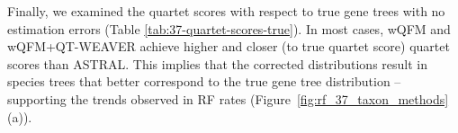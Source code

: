 \documentclass[runningheads]{llncs}
\begin{document}
Finally, we examined the quartet scores with respect to true gene trees with no estimation errors (Table \ref{tab:37-quartet-scores-true}). 
In most cases, wQFM and wQFM+QT-WEAVER achieve higher and closer (to true quartet score) quartet scores than ASTRAL. This implies that the corrected distributions result in species trees that better correspond to the true gene tree distribution -- supporting the trends observed in RF rates (Figure~\ref{fig:rf_37_taxon_methods}(a)). 







\end{document}
